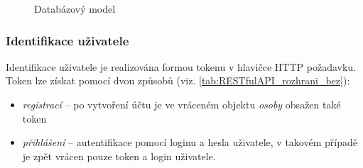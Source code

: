 \documentclass[thesis=B,czech]{FITthesis}[2012/06/26]
\begin{document}
\begin{figure}
	\caption{Databázový model}\label{fig:gtd_database_model}
\end{figure}

\subsubsection{Identifikace uživatele}
\label{realization:user_autentorization}
Identifikace uživatele je realizována formou tokenu v hlavičce HTTP požadavku. Token lze získat pomocí dvou způsobů (viz. \ref{tab:RESTfulAPI_rozhrani_bez}):
\begin{itemize}[nosep]
	\item \textit{registrací} -- po vytvoření účtu je ve vráceném objektu \textit{osoby} obsažen také token
	\item \textit{přihlášení} -- autentifikace pomocí loginu a hesla uživatele, v takovém případě je zpět vrácen pouze token a login uživatele.
\end{itemize}
\end{document}
